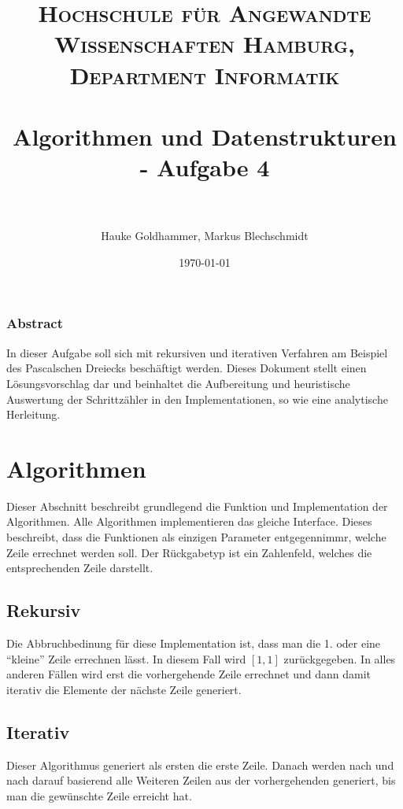 \documentclass[paper=a4, fontsize=11pt]{scrartcl} %
\title{
\normalfont \normalsize
\textsc{Hochschule für Angewandte Wissenschaften Hamburg, Department Informatik} \\ [25pt] %
\horrule{0.5pt} \\[0.4cm] %
\huge Algorithmen und Datenstrukturen - Aufgabe 4 \\ %
\horrule{2pt} \\[0.5cm] %
}
\author{Hauke Goldhammer, Markus Blechschmidt} %
\date{\normalsize\today} %
\numberwithin{equation}{section} %
\numberwithin{figure}{section} %
\numberwithin{table}{section} %
\begin{document}
\maketitle %

\subsubsection*{Abstract}
In dieser Aufgabe soll sich mit rekursiven und iterativen Verfahren am Beispiel
des Pascalschen Dreiecks beschäftigt werden. Dieses Dokument stellt einen L\"osungsvorschlag
dar und beinhaltet die Aufbereitung und heuristische Auswertung der Schrittz\"ahler
in den Implementationen, so wie eine analytische Herleitung.

\renewcommand{\contentsname}{Inhaltsangabe}
\renewcommand*\listtablename{Tabellen}
\renewcommand*\listfigurename{Darstellungen}
\tableofcontents
\listoffigures

\clearpage

\section{Algorithmen}

Dieser Abschnitt beschreibt grundlegend die Funktion und Implementation der Algorithmen.
Alle Algorithmen implementieren das gleiche Interface. Dieses beschreibt, dass die
Funktionen als einzigen Parameter entgegennimmr, welche Zeile errechnet werden soll.
Der R\"uckgabetyp ist ein Zahlenfeld, welches die entsprechenden Zeile darstellt.

\subsection{Rekursiv}
Die Abbruchbedinung f\"ur diese Implementation ist, dass man die 1. oder eine
``kleine'' Zeile errechnen l\"asst. In diesem Fall wird $[1, 1]$ zur\"uckgegeben.
In alles anderen F\"allen wird erst die vorhergehende Zeile errechnet und dann
damit iterativ die Elemente der n\"achste Zeile generiert.

\subsection{Iterativ}
Dieser Algorithmus generiert als ersten die erste Zeile. Danach werden nach und
nach darauf basierend alle Weiteren Zeilen aus der vorhergehenden generiert, bis
man die gew\"unschte Zeile erreicht hat.
\end{document}
